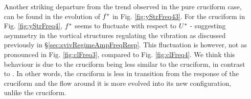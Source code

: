 \documentclass[oneside]{utmthesis}
\begin{document}
Another striking departure from the trend observed in the pure cruciform case, can be found in the evolution of $f^{*}$ in Fig. \ref{fig:yStrFreq43}. For the \angfo{} cruciform in Fig. \ref{fig:yStrFreq4}, $f^{*}$ seems to fluctuate with respect to $U^{*}$ - suggesting asymmetry in the vortical structures regulating the vibration as discussed previously in \S\ref{sec:svivRegimeAmpFreqResp}. This fluctuation is however, not as pronounced in Fig. \ref{fig:clFreq3}, compared to Fig. \ref{fig:clFreq4}. We think this behaviour is due to the \angth{} cruciform being less similar to the \angfi{} cruciform, in contrast to \angfo{}. In other words, the \angth{} cruciform is less in transition from the response of the \angfi{} cruciform and the flow around it is more evolved into its new configuration, unlike the \angfo{} cruciform.
\end{document}
